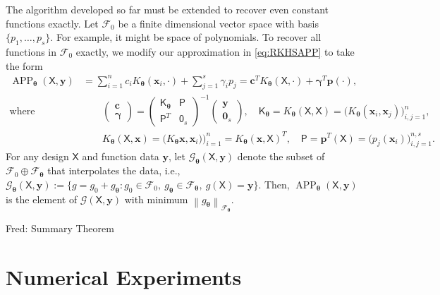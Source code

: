 \documentclass[]{mcom-l}
\theoremstyle{remark}
\DeclareMathOperator{\APP}{APP}
\newcommand{\mK}{\mathsf{K}}
\newcommand{\mP}{\mathsf{P}}
\newcommand{\mX}{\mathsf{X}}
\newcommand{\mZero}{\mathsf{0}}
\newcommand{\bzero}{\boldsymbol{0}}
\newcommand{\bc}{{\boldsymbol{c}}}
\newcommand{\bx}{{\boldsymbol{x}}}
\newcommand{\bp}{{\boldsymbol{p}}}
\newcommand{\by}{{\boldsymbol{y}}}
\newcommand{\bgamma}{{\boldsymbol{\gamma}}}
\newcommand{\btheta}{{\boldsymbol{\theta}}}
\newcommand{\calf}{{\mathcal{F}}}
\newcommand{\calg}{{\mathcal{G}}}
\newcommand{\norm}[2][{}]{\ensuremath{\left \lVert #2 \right \rVert}_{#1}}
\newcommand{\FredNote}[1]{{\color{blue}Fred: #1}}
\begin{document}
The algorithm developed so far must be extended to recover even constant functions exactly.  Let $\calf_0$ be a finite dimensional vector space with basis $\{p_1, \ldots, p_s\}$.  For example, it might be space of polynomials.  To recover all functions in $\calf_0$ exactly, we modify our approximation in \eqref{eq:RKHSAPP} to take the form 
\begin{subequations} \label{eq:RKHSAPP_P}
	\begin{align} 
	\APP_\btheta(\mX,\by) &= \sum_{i=1}^n c_i K_\btheta(\bx_i,\cdot) + \sum_{j=1}^s \gamma_i p_j = \bc^T K_\btheta(\mX,\cdot) + \bgamma^T \bp(\cdot), \\
	\text{where } & \qquad \begin{pmatrix} \bc \\ \bgamma \end{pmatrix} = 
	\begin{pmatrix} \mK_\btheta  & \mP \\ \mP^T & \mZero_s \end{pmatrix}^{-1} 
	\begin{pmatrix}\by \\ \bzero_s \end{pmatrix}, 
	\quad \mK_\btheta = K_\btheta(\mX,\mX) = \bigl( K_\btheta(\bx_i,\bx_j) \bigr)_{i,j=1}^n,  \\
	& \qquad  K_\btheta(\mX,\bx) = \bigl(K_\btheta\bx,\bx_i) \bigr)_{i=1}^n =  K_\btheta(\bx, \mX)^T, \quad \mP = \bp^T(\mX) = \bigl( p_j(\bx_i)\bigr )_{i,j=1}^{n,s}.
	\end{align}
\end{subequations}
For any design $\mX$ and function data $\by$, let $\calg_\btheta(\mX,\by)$ denote the subset of $\calf_0 \oplus \calf_\btheta$ that interpolates the data, i.e., $\calg_\btheta(\mX,\by) := \{ g = g_0 + g_{\btheta} : g_0 \in \calf_0, \ g_{\btheta} \in \calf_{\btheta}, \ g(\mX)  = \by\}$.  Then, $\APP_\btheta(\mX,\by) $ is the element of $\calg(\mX,\by)$ with minimum $\norm[\calf_\btheta]{g_{\btheta}}$.







\FredNote{Summary Theorem}
\section{Numerical Experiments}
\end{document}
